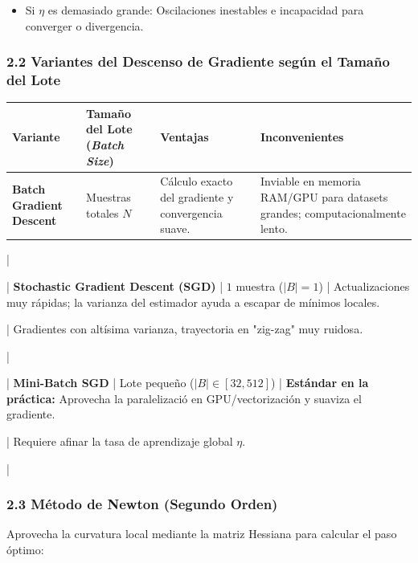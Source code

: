 \documentclass[11pt,oneside]{article}
\begin{document}
\begin{itemize}

\item Si \(\eta\) es demasiado grande: Oscilaciones inestables e incapacidad para converger o divergencia.

\end{itemize}

\subsubsection{2.2 Variantes del Descenso de Gradiente según el Tamaño del Lote}

\begin{center}
\begin{tabularx}{\textwidth}{>{\raggedright\arraybackslash}X >{\raggedright\arraybackslash}X >{\raggedright\arraybackslash}X >{\raggedright\arraybackslash}X}
\toprule
Variante & Tamaño del Lote (\emph{Batch Size}) & Ventajas & Inconvenientes \\
\midrule
\textbf{Batch Gradient Descent} & Muestras totales \(N\) & Cálculo exacto del gradiente y convergencia suave. & Inviable en memoria RAM/GPU para datasets grandes; computacionalmente lento. \\
\bottomrule
\end{tabularx}
\end{center}

 |

| \textbf{Stochastic Gradient Descent (SGD)} | \(1\) muestra (\(\vert{}B\vert{} = 1\)) | Actualizaciones muy rápidas; la varianza del estimador ayuda a escapar de mínimos locales.

 | Gradientes con altísima varianza, trayectoria en "zig-zag" muy ruidosa.

 |

| \textbf{Mini-Batch SGD} | Lote pequeño (\(\vert{}B\vert{} \in [32, 512]\)) | \textbf{Estándar en la práctica:} Aprovecha la paralelizació en GPU/vectorización y suaviza el gradiente.

 | Requiere afinar la tasa de aprendizaje global \(\eta\).

 |

\subsubsection{2.3 Método de Newton (Segundo Orden)}

Aprovecha la curvatura local mediante la matriz Hessiana para calcular el paso óptimo:
\end{document}
